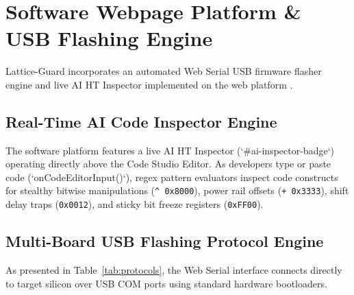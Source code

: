 \documentclass[conference]{IEEEtran}
\begin{document}
\section{Software Webpage Platform \& USB Flashing Engine}
Lattice-Guard incorporates an automated Web Serial USB firmware flasher engine and live AI HT Inspector implemented on the web platform \cite{w3cwebserial}.

\begin{table}[htbp]
\caption{Target Board USB Flashing \& Telemetry Protocols}
\label{tab:protocols}
\begin{center}
\end{center}
\end{table}

\subsection{Real-Time AI Code Inspector Engine}
The software platform features a live AI HT Inspector (`#ai-inspector-badge`) operating directly above the Code Studio Editor. As developers type or paste code (`onCodeEditorInput()`), regex pattern evaluators inspect code constructs for stealthy bitwise manipulations (\texttt{\^{} 0x8000}), power rail offsets (\texttt{+ 0x3333}), shift delay traps (\texttt{0x0012}), and sticky bit freeze registers (\texttt{0xFF00}).

\subsection{Multi-Board USB Flashing Protocol Engine}
As presented in Table~\ref{tab:protocols}, the Web Serial interface connects directly to target silicon over USB COM ports using standard hardware bootloaders.
\end{document}

